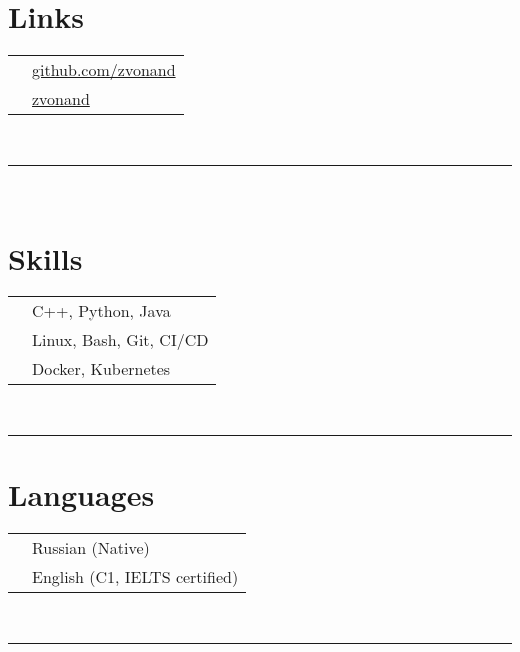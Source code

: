 \documentclass[oneside]{article}
\begin{document}
{\begin{minipage}[t][\textheight-2\fboxsep-2\fboxrule][t]{\dimexpr0.40\textwidth-2\fboxrule-2\fboxsep\relax}
        \section*{\large Links}
        \begin{tabular}{cl}
            \faGithub{}   & \href{https://github.com/zvonand}{github.com/zvonand} \\
            \faLinkedin{} & \href{https://www.linkedin.com/in/zvonand/}{zvonand} \\
        \end{tabular}
        \vspace{10pt} \\
        \rule{\linewidth}{0.4pt} \\
        \section*{\large Skills}
        \begin{tabularx}{\textwidth}{cY}
            \faLanguage{}        & C++, Python, Java \\
            \faCogs{}      & Linux, Bash, Git, CI/CD \\
            \faCode{}        & Docker, Kubernetes \\
        \end{tabularx}
        \vspace{1pt} \\
        \rule{\linewidth}{0.4pt}
        \section*{\large Languages}
        \begin{tabular}{cl}
            \faLanguage{} & Russian (Native) \\
            \faLanguage{} & English (C1, IELTS certified)
        \end{tabular}
        \vspace{.3cm}
        \\
        \rule{\linewidth}{0.4pt}
        \\
    \end{minipage}
}
\end{document}
